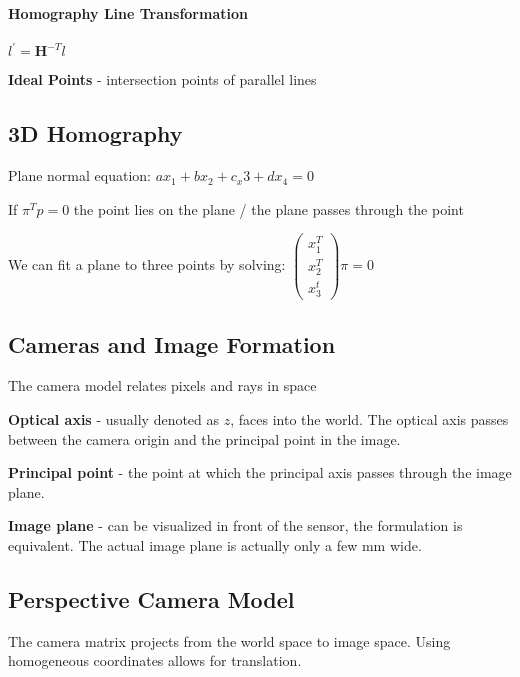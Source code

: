 


\paragraph{Homography Line Transformation}

$l^\prime = \mathbf{H}^{-T} l$

\textbf{Ideal Points} - intersection points of parallel lines

\subsection{3D Homography}

Plane normal equation: $ax_1 + bx_2 + c_x3 + d x_4 = 0$ 

If $\pi^T p = 0$ the point lies on the plane / the plane passes through the point

We can fit a plane to three points by solving:
$\left( \begin{matrix} x_1^T \\ x_2^T \\ x_3^t \end{matrix} \right) \pi = 0 $

\subsection{Cameras and Image Formation}

The camera model relates pixels and rays in space

\textbf{Optical axis} - usually denoted as $z$, faces into the world. The optical axis passes between the camera origin and the principal point in the image.

\textbf{Principal point} - the point at which the principal axis passes through the image plane.

\textbf{Image plane} - can be visualized in front of the sensor, the formulation is equivalent. The actual image plane is actually only a few mm wide.

\subsection{Perspective Camera Model}
The camera matrix projects from the world space to image space. Using homogeneous coordinates allows for translation. 

